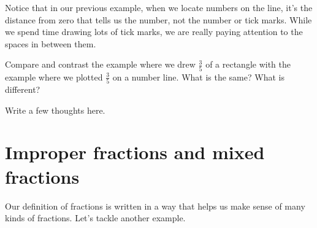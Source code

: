 \documentclass{ximera}
\begin{document}
Notice that in our previous example, when we locate numbers on the line, it's the distance from zero that tells us the number, not the number or tick marks. While we spend time drawing lots of tick marks, we are really paying attention to the spaces in between them. 

\begin{question}
Compare and contrast the example where we drew $\frac{3}{5}$ of a rectangle with the example where we plotted $\frac{3}{5}$ on a number line. What is the same? What is different?

\begin{freeResponse}
Write a few thoughts here.
\end{freeResponse}
\end{question}





\section{Improper fractions and mixed fractions}

Our definition of fractions is written in a way that helps us make sense of many kinds of fractions. Let's tackle another example.
	
\end{document}

